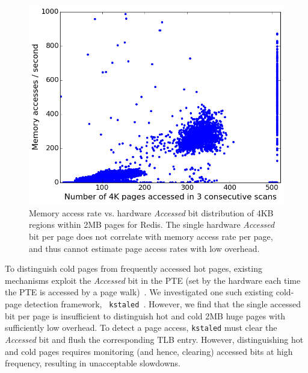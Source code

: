 \begin{figure}[t]
\centering
\includegraphics[width=1.0\columnwidth]{asplos2017/figures/redis-plot-3.png}
\caption{Memory access rate vs. hardware {\it Accessed} bit distribution of 4KB
regions within 2MB pages for Redis. The single hardware {\it Accessed} bit per page
does not correlate with memory access rate per page, and thus cannot
estimate page access rates with low overhead.}
\label{fig:redis-access-bit}
\end{figure}

To distinguish cold pages from frequently accessed hot pages, existing
mechanisms exploit the \emph{Accessed} bit in the PTE (set by the hardware each time
the PTE is accessed by a page walk)~\cite{kstaled,vmware-mm,
ref:Guo:2015:PBL:2731186.2731187}. We
investigated one such existing cold-page detection framework, {\tt
kstaled}~\cite{kstaled}. However, we find that the single accessed bit
per page is insufficient to distinguish hot and cold 2MB huge pages with 
sufficiently low overhead. To detect a page access, {\tt kstaled} must clear the
 \emph{Accessed} bit  and flush the corresponding TLB entry.  However, 
 distinguishing hot and cold pages requires monitoring (and hence, clearing)
 accessed bits at high frequency, resulting in unacceptable slowdowns.

